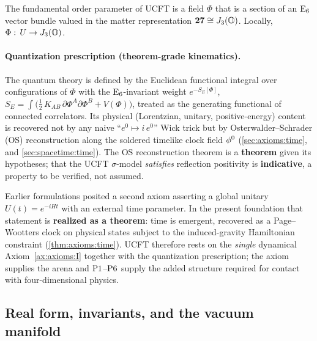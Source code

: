 \begin{axiom}\label{ax:axioms:I}
The fundamental order parameter of UCFT is a field $\Phi$ that is a section
of an $\mathrm{E}_{6}$ vector bundle valued in the matter representation
$\mathbf{27}\cong J_3(\mathbb{O})$. Locally, $\Phi:\,U\to J_3(\mathbb{O})$.
\end{axiom}

\paragraph{Quantization prescription (theorem-grade kinematics).}
The quantum theory is defined by the Euclidean functional integral over
configurations of $\Phi$ with the $\mathrm{E}_{6}$-invariant weight $e^{-S_E[\Phi]}$,
$S_E=\int\!\bigl(\tfrac12\,K_{\!AB}\,\partial\Phi^A\partial\Phi^B+V(\Phi)\bigr)$,
treated as the generating functional of connected correlators. Its physical
(Lorentzian, unitary, positive-energy) content is recovered not by any naive
``$e^0\mapsto i\,e^0$'' Wick trick but by Osterwalder--Schrader (OS)
reconstruction along the soldered timelike clock field $\phi^{0}$
(\autoref{sec:axioms:time}, and \autoref{sec:spacetime:time}). The OS
reconstruction theorem is a \textbf{theorem} given its hypotheses; that the
UCFT $\sigma$-model \emph{satisfies} reflection positivity is
\textbf{indicative}, a property to be verified, not assumed.

\begin{remark}\label{rem:axioms:honest}
Earlier formulations posited a second axiom asserting a global unitary
$U(t)=e^{-iHt}$ with an external time parameter. In the present foundation
that statement is \textbf{realized as a theorem}: time is emergent, recovered
as a Page--Wootters clock on physical states subject to the induced-gravity
Hamiltonian constraint (\autoref{thm:axioms:time}). UCFT therefore rests on the
\emph{single} dynamical Axiom~\ref{ax:axioms:I} together with the quantization
prescription; the axiom supplies the arena and $\textnormal{P1}$--$\textnormal{P6}$ supply the
added structure required for contact with four-dimensional physics.
\end{remark}

\subsection{Real form, invariants, and the vacuum manifold}
\label{sec:axioms:realform}

